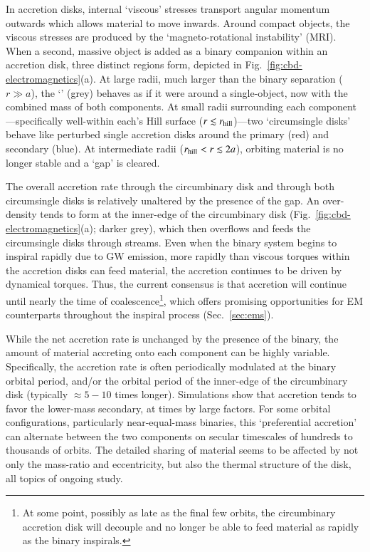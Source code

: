 \documentclass[onecolumn,authoryear]{els-mrw}
\begin{document}
In accretion disks, internal `viscous' stresses transport angular momentum outwards which allows material to move inwards.  Around compact objects, the viscous stresses are produced by the `magneto-rotational instability' (MRI).  When a second, massive object is added as a binary companion within an accretion disk, three distinct regions form, depicted in Fig.~\ref{fig:cbd-electromagnetics}(a).  At large radii, much larger than the binary separation ($r \gg a$), the `' (grey) behaves as if it were around a single-object, now with the combined mass of both components.  At small radii surrounding each component---specifically well-within each's Hill surface ($r \lesssim r_{\textrm{hill}}$)---two `circumsingle disks' behave like perturbed single accretion disks around the primary (red) and secondary (blue).  At intermediate radii ($r_{\textrm{hill}} < r \lesssim 2 a$), orbiting material is no longer stable and a `gap' is cleared.

The overall accretion rate through the circumbinary disk and through both circumsingle disks is relatively unaltered by the presence of the gap.  An over-density tends to form at the inner-edge of the circumbinary disk (Fig.~\ref{fig:cbd-electromagnetics}(a); darker grey), which then overflows and feeds the circumsingle disks through streams.  Even when the binary system begins to inspiral rapidly due to GW emission, more rapidly than viscous torques within the accretion disks can feed material, the accretion continues to be driven by dynamical torques.  Thus, the current consensus is that accretion will continue until nearly the time of coalescence\footnote{At some point, possibly as late as the final few orbits, the circumbinary accretion disk will decouple and no longer be able to feed material as rapidly as the binary inspirals.}, which offers promising opportunities for EM counterparts throughout the inspiral process (Sec.~\ref{sec:ems}).

While the net accretion rate is unchanged by the presence of the binary, the amount of material accreting onto each component can be highly variable.  Specifically, the accretion rate is often periodically modulated at the binary orbital period, and/or the orbital period of the inner-edge of the circumbinary disk (typically $\approx 5-10$ times longer).  Simulations show that accretion tends to favor the lower-mass secondary, at times by large factors.  For some orbital configurations, particularly near-equal-mass binaries, this `preferential accretion' can alternate between the two components on secular timescales of hundreds to thousands of orbits.  The detailed sharing of material seems to be affected by not only the mass-ratio and eccentricity, but also the thermal structure of the disk, all topics of ongoing study.
\end{document}
